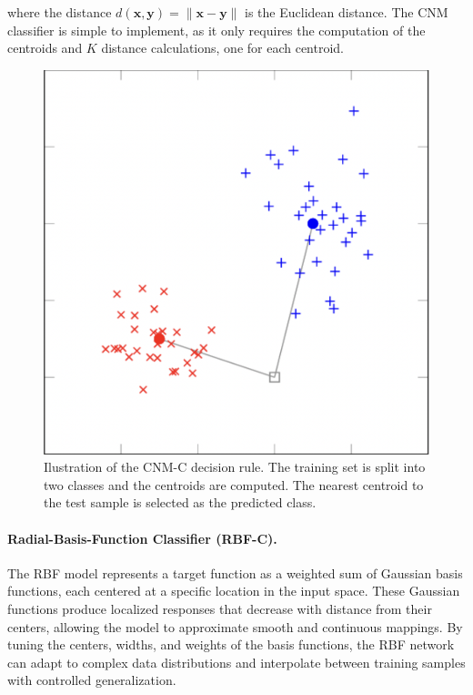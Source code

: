 \documentclass[twocolumn]{article} %
\begin{document}
where the distance \(d(\mathbf x, \mathbf y) = \|\mathbf x - \mathbf y\|\) is the Euclidean distance. 
The CNM classifier is simple to implement, as it only requires the computation of the centroids and $K$ distance calculations, one for each centroid.

\begin{figure}[h]
    \centering
    \includegraphics[width=\linewidth]{figures/nearest_mean_classifier.png}
    \caption{Ilustration of the CNM-C decision rule. The training set is split into two classes and the centroids are computed. The nearest centroid to the test sample is selected as the predicted class.}
    \label{fig:nearest_mean_classifier}
\end{figure}

\paragraph{Radial-Basis-Function Classifier (RBF-C).}
The RBF model represents a target function as a weighted sum of Gaussian basis functions, each centered at a specific location in the input space. These Gaussian functions produce localized responses that decrease with distance from their centers, allowing the model to approximate smooth and continuous mappings. By tuning the centers, widths, and weights of the basis functions, the RBF network can adapt to complex data distributions and interpolate between training samples with controlled generalization.
\end{document}
